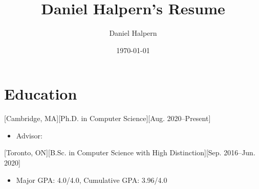 \documentclass{article}
\title{Daniel Halpern's Resume}
\author{Daniel Halpern}
\date{\today}
\newcommand{\link}[2]{\iftoggle{uselinks}{\href{#1}{#2}}{#2}\xspace}
\begin{document}

    \makecvtitle %

    \section{Education}

    [Cambridge, MA][Ph.D. in Computer Science][Aug. 2020--Present]
    \begin{itemize}
        \item Advisor: \link{http://procaccia.info}{Ariel Procaccia}
    \end{itemize}

    [Toronto, ON][B.Sc. in Computer Science with High Distinction][Sep. 2016--Jun. 2020]
    \begin{itemize}
        \item Major GPA: 4.0/4.0, Cumulative GPA: 3.96/4.0
    \end{itemize}
\end{document}
